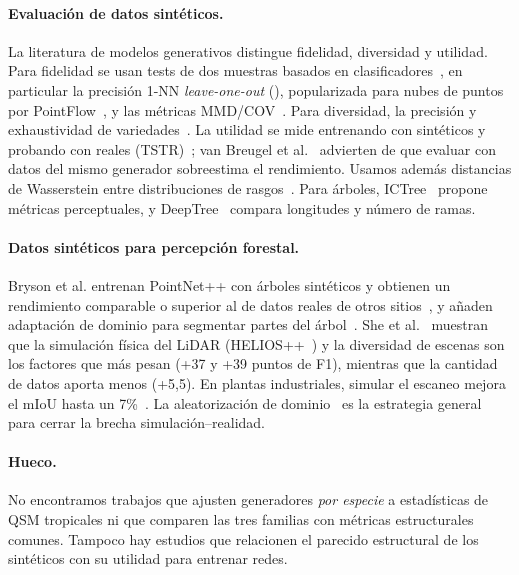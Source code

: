 \documentclass[11pt,a4paper]{article}
\newcommand{\NNA}{\text{1-NNA}}
\begin{document}
\paragraph{Evaluación de datos sintéticos.}
La literatura de modelos generativos distingue fidelidad, diversidad y utilidad. Para fidelidad se usan tests de dos muestras basados en clasificadores~\cite{lopezpaz2017c2st}, en particular la precisión 1-NN \emph{leave-one-out} (\NNA), popularizada para nubes de puntos por PointFlow~\cite{yang2019pointflow}, y las métricas MMD/COV~\cite{achlioptas2018learning}. Para diversidad, la precisión y exhaustividad de variedades~\cite{kynkaanniemi2019precision}. La utilidad se mide entrenando con sintéticos y probando con reales (TSTR)~\cite{esteban2017rcgan}; van Breugel et al.~\cite{vanbreugel2023synthetic} advierten de que evaluar con datos del mismo generador sobreestima el rendimiento. Usamos además distancias de Wasserstein entre distribuciones de rasgos~\cite{ramdas2017wasserstein}. Para árboles, ICTree~\cite{polasek2021ictree} propone métricas perceptuales, y DeepTree~\cite{zhou2023deeptree} compara longitudes y número de ramas.

\paragraph{Datos sintéticos para percepción forestal.}
Bryson et al. entrenan PointNet++ con árboles sintéticos y obtienen un rendimiento comparable o superior al de datos reales de otros sitios~\cite{bryson2023synthetic}, y añaden adaptación de dominio para segmentar partes del árbol~\cite{bryson2024domain}. She et al.~\cite{she2026scaling} muestran que la simulación física del LiDAR (HELIOS++~\cite{winiwarter2022helios}) y la diversidad de escenas son los factores que más pesan (+37 y +39 puntos de F1), mientras que la cantidad de datos aporta menos (+5,5). En plantas industriales, simular el escaneo mejora el mIoU hasta un 7\%~\cite{noichl2024industrial}. La aleatorización de dominio~\cite{tobin2017domain} es la estrategia general para cerrar la brecha simulación--realidad.

\paragraph{Hueco.} No encontramos trabajos que ajusten generadores \emph{por especie} a estadísticas de QSM tropicales ni que comparen las tres familias con métricas estructurales comunes. Tampoco hay estudios que relacionen el parecido estructural de los sintéticos con su utilidad para entrenar redes.
\end{document}

